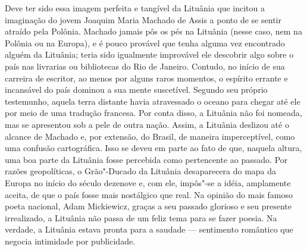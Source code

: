 Deve ter sido essa imagem perfeita e tangível da Lituânia que incitou a
imaginação do jovem Joaquim Maria Machado de Assis a ponto de se sentir
atraído pela Polônia. Machado jamais pôs os pés na Lituânia (nesse caso,
nem na Polônia ou na Europa), e é pouco provável que tenha alguma vez
encontrado alguém da Lituânia; teria sido igualmente improvável ele
descobrir algo sobre o país nas livrarias ou bibliotecas do Rio de
Janeiro. Contudo, no início de sua carreira de escritor, ao menos por
alguns raros momentos, o espírito errante e incansável do país dominou a
sua mente suscetível. Segundo seu próprio testemunho, aquela terra
distante havia atravessado o oceano para chegar até ele por meio de uma
tradução francesa. Por conta disso, a Lituânia não foi nomeada, mas se
apresentou sob a pele de outra nação. Assim, a Lituânia deslizou até o
alcance de Machado e, por extensão, do Brasil, de maneira imperceptível,
como uma confusão cartográfica. Isso se deveu em parte ao fato de que,
naquela altura, uma boa parte da Lituânia fosse percebida como
pertencente ao passado. Por razões geopolíticas, o Grão"-Ducado da
Lituânia desaparecera do mapa da Europa no início do século dezenove e,
com ele, impôs"-se a idéia, amplamente aceita, de que o país fosse mais
nostálgico que real. Na opinião do mais famoso poeta nacional, Adam
Mickiewicz, graças a seu passado glorioso e seu presente irrealizado, a
Lituânia não passa de um feliz tema para se fazer poesia. Na verdade, a
Lituânia estava pronta para a saudade --- sentimento romântico que negocia
intimidade por publicidade.

